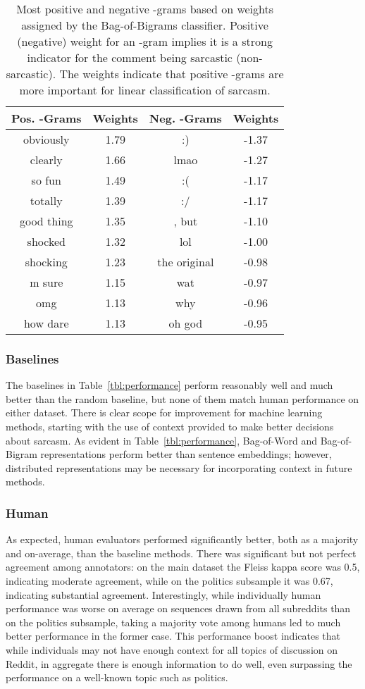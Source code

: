 \documentclass[10pt, a4paper]{article}
\begin{document}
\begin{table}
	\centering
	\begin{tabular}{c c c c}
		Pos. -Grams & Weights & Neg. -Grams & Weights\\
		\toprule
		obviously & 1.79 & :) & -1.37\\
		clearly & 1.66 & lmao & -1.27\\
		so fun & 1.49 & :( & -1.17\\
		totally & 1.39 & :/ & -1.17\\
		good thing & 1.35 & , but & -1.10\\
		shocked & 1.32 & lol & -1.00\\
		shocking & 1.23 & the original & -0.98\\
		m sure & 1.15 & wat & -0.97\\
		omg & 1.13 & why & -0.96\\
		how dare & 1.13 & oh god & -0.95\\
	\end{tabular}
	\caption{Most positive and negative -grams based on weights assigned by the Bag-of-Bigrams classifier. Positive (negative) weight for an -gram implies it is a strong indicator for the comment being sarcastic (non-sarcastic). The weights indicate that positive -grams are more important for linear classification of sarcasm.}
\end{table}

\subsubsection{Baselines}
The baselines in Table~\ref{tbl:performance} perform reasonably well and much better than the random baseline, but none of them match human performance on either dataset. There is clear scope for improvement for machine learning methods, starting with the use of context provided to make better decisions about sarcasm. As evident in Table~\ref{tbl:performance}, Bag-of-Word and Bag-of-Bigram representations perform better than sentence embeddings; however, distributed representations may be necessary for incorporating context in future methods.

\subsubsection{Human}
As expected, human evaluators performed significantly better, both as a majority and on-average, than the baseline methods. There was significant but not perfect agreement among annotators: on the main dataset the Fleiss kappa score \cite{Fleiss:71} was 0.5, indicating moderate agreement, while on the politics subsample it was 0.67, indicating substantial agreement. Interestingly, while individually human performance was worse on average on sequences drawn from all subreddits than on the politics subsample, taking a majority vote among humans led to much better performance in the former case. This performance boost indicates that while individuals may not have enough context for all topics of discussion on Reddit, in aggregate there is enough information to do well, even surpassing the performance on a well-known topic such as politics.
 
\end{document}
